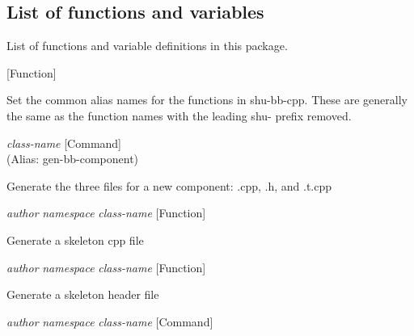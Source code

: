 \subsection{List of functions and variables}

List of functions and variable definitions in this package.



\vspace{1em}
\noindent
{}
\usebox{\funcname}
 \hfill [Function]

\begin{doc-string}
Set the common alias names for the functions in shu-bb-cpp.
These are generally the same as the function names with the leading
shu- prefix removed.
\end{doc-string}

\vspace{1em}
\noindent
{}
\usebox{\funcname}\emph{class-name}
 \hfill [Command]\\%
 (Alias: gen-bb-component)

\begin{doc-string}
Generate the three files for a new component: .cpp, .h, and .t.cpp
\end{doc-string}

\vspace{1em}
\noindent
{}
\usebox{\funcname}\emph{author} \emph{namespace} \emph{class-name}
 \hfill [Function]

\begin{doc-string}
Generate a skeleton cpp file
\end{doc-string}

\vspace{1em}
\noindent
{}
\usebox{\funcname}\emph{author} \emph{namespace} \emph{class-name}
 \hfill [Function]

\begin{doc-string}
Generate a skeleton header file
\end{doc-string}

\vspace{1em}
\noindent
{}
\usebox{\funcname}\emph{author} \emph{namespace} \emph{class-name}
 \hfill [Command]

